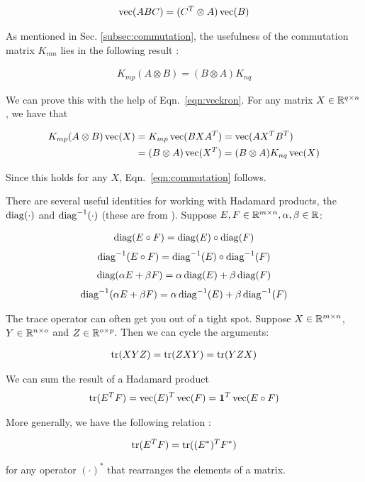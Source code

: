 \begin{align}
\operatorname{vec}(ABC) = (C^T \otimes A) \operatorname{vec}(B) \label{eqn:veckron}
\end{align}

As mentioned in Sec. \ref{subsec:commutation}, the usefulness of the commutation matrix $K_{mn}$ lies in the following result \citep{magnus1988matrix}:

\begin{align}
K_{mp} (A \otimes B) = (B \otimes A) K_{nq}  \label{eqn:commutation}
\end{align}

We can prove this with the help of Eqn.~\ref{eqn:veckron}. For any matrix $X \in \mathbb{R}^{q \times n}$, we have that

\begin{align*}
  K_{mp} (A \otimes B) \operatorname{vec}(X) &= K_{mp} \operatorname{vec}(B X A^T) = \operatorname{vec}(A X^T B^T) \\
                              &= (B \otimes A) \operatorname{vec}(X^T) = (B \otimes A) K_{nq}\operatorname{vec}(X)
\end{align*}

Since this holds for any $X$, Eqn.~\ref{eqn:commutation} follows. 

There are several useful identities for working with Hadamard products, the $\operatorname{diag}(\cdot)$ and $\operatorname{diag}^{-1}(\cdot)$ (these are from \cite{minka2000old}).  Suppose $E, F \in \mathbb{R}^{m \times n}, \alpha, \beta \in \mathbb{R}$:

\begin{align}
  \operatorname{diag}(E \circ F) = \operatorname{diag}(E) \circ \operatorname{diag} (F) \label{eqn:diagHadProd}
\end{align}
\begin{align}
  \operatorname{diag}^{-1}(E \circ F) = \operatorname{diag}^{-1}(E) \circ \operatorname{diag}^{-1}(F) \label{eqn:diagInvHadProd}
\end{align}
\begin{align}
  \operatorname{diag}(\alpha E + \beta F) = \alpha \operatorname{diag}(E) + \beta \operatorname{diag} (F) \label{eqn:diagLinear}
\end{align}
\begin{align}
  \operatorname{diag}^{-1}(\alpha E + \beta F) = \alpha \operatorname{diag}^{-1}(E) + \beta \operatorname{diag}^{-1}(F) \label{eqn:diagInvLinear}
\end{align}

The trace operator can often get you out of a tight spot.  Suppose $X \in \mathbb{R}^{m \times n}$, $Y \in \mathbb{R}^{n \times o}$ and $Z \in \mathbb{R}^{o\times p}$.  Then we can cycle the arguments:

\begin{align*}
  \operatorname{tr}(XYZ) = \operatorname{tr}(ZXY) = \operatorname{tr}(YZX)
\end{align*}

We can sum the result of a Hadamard product 
\begin{align*}
  \operatorname{tr}(E^TF) = \operatorname{vec}(E)^T\operatorname{vec}(F) = \mathbf{1}^T \operatorname{vec}(E \circ F)
\end{align*}

More generally, we have the following relation \citep{minka2000old}:

\begin{align}
  \operatorname{tr}(E^T F) = \operatorname{tr}((E^*)^T F^*)
\end{align}

for any operator $(\cdot)^*$ that rearranges the elements of a matrix.


